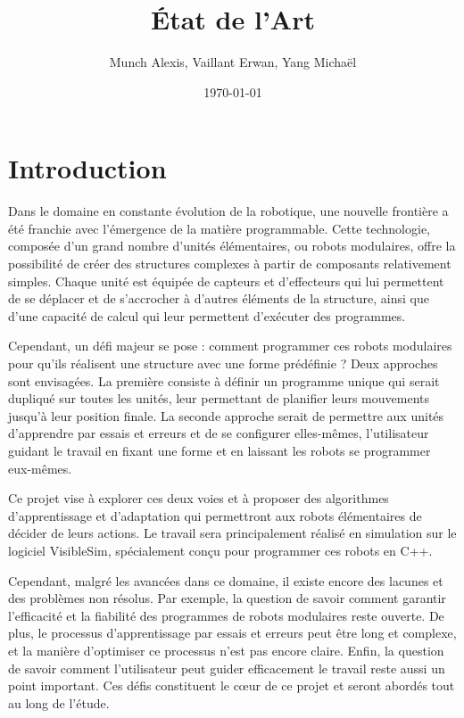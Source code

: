 \documentclass{article}
\title{État de l'Art}
\author{Munch Alexis, Vaillant Erwan, Yang Michaël}
\date{\today}
\begin{document}
\maketitle

\section{Introduction}

Dans le domaine en constante évolution de la robotique, une nouvelle frontière a
été franchie avec l'émergence de la matière programmable. Cette technologie,
composée d'un grand nombre d'unités élémentaires, ou robots modulaires, offre la
possibilité de créer des structures complexes à partir de composants
relativement simples. Chaque unité est équipée de capteurs et d'effecteurs qui
lui permettent de se déplacer et de s'accrocher à d'autres éléments de la
structure, ainsi que d'une capacité de calcul qui leur permettent d'exécuter des
programmes.

Cependant, un défi majeur se pose : comment programmer ces robots modulaires
pour qu'ils réalisent une structure avec une forme prédéfinie ? Deux approches
sont envisagées. La première consiste à définir un programme unique qui serait
dupliqué sur toutes les unités, leur permettant de planifier leurs mouvements
jusqu'à leur position finale. La seconde approche serait de permettre aux unités
d'apprendre par essais et erreurs et de se configurer elles-mêmes, l'utilisateur
guidant le travail en fixant une forme et en laissant les robots se programmer
eux-mêmes.

Ce projet vise à explorer ces deux voies et à proposer des algorithmes
d'apprentissage et d'adaptation qui permettront aux robots élémentaires de
décider de leurs actions. Le travail sera principalement réalisé en simulation
sur le logiciel VisibleSim, spécialement conçu pour programmer ces robots en
C++.

Cependant, malgré les avancées dans ce domaine, il existe encore des lacunes et
des problèmes non résolus. Par exemple, la question de savoir comment garantir
l'efficacité et la fiabilité des programmes de robots modulaires reste ouverte.
De plus, le processus d'apprentissage par essais et erreurs peut être long et
complexe, et la manière d'optimiser ce processus n'est pas encore claire. Enfin,
la question de savoir comment l'utilisateur peut guider efficacement le travail
reste aussi un point important. Ces défis constituent le cœur de ce projet et
seront abordés tout au long de l'étude.
\end{document}
